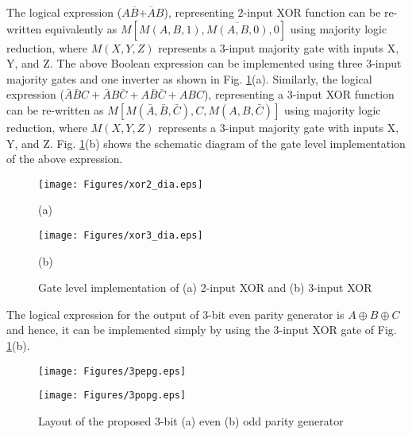 \documentclass[conference]{IEEEtran}
\begin{document}
 
The logical expression ($A\overline{B}$+$\overline{A}B$), representing $2$-input XOR function can be re-written equivalently as $M[M(A, B, 1), \overline{M(A, B, 0)}, 0]$ using majority logic reduction, where $M(X,Y,Z)$ represents a $3$-input majority gate \cite{lent_jap1994} with inputs X, Y, and Z.
The above Boolean expression can be implemented using three $3$-input majority gates and one inverter as shown in Fig. \ref{fig:XORs}(a).
Similarly, the logical expression ($\bar{A}\bar{B}C+\bar{A}B\bar{C}+A\bar{B}\bar{C}+ABC$), representing a $3$-input XOR function can be re-written as $M[{M(\bar{A},\bar{B},\bar{C})}, C, M(A, B,\bar{C})]$ using majority logic reduction, where $M(X,Y,Z)$ represents a $3$-input majority gate with inputs X, Y, and Z.
Fig. \ref{fig:XORs}(b) shows the schematic diagram of the gate level implementation of the above expression.
\begin{figure}[ht!]
\center
\texttt{[image: Figures/xor2\_dia.eps]}
\vspace{1 cm}
\centerline{(a)}
\texttt{[image: Figures/xor3\_dia.eps]}
\centerline{(b)}
\caption{\small Gate level implementation of (a) 2-input XOR and (b) 3-input XOR}
\label{fig:XORs}
\end{figure}
The logical expression for the output of $3$-bit even parity generator is $A \oplus B\oplus C$ and hence, it can be implemented simply by using the $3$-input XOR gate of Fig. \ref{fig:XORs}(b).
\begin{figure}[ht]
\hspace{-0.8cm}
\begin{minipage}[b]{0.45\linewidth}
\centering
\vspace{-1cm}
\texttt{[image: Figures/3pepg.eps]}
\vspace{-3cm}
\end{minipage}
\begin{minipage}[b]{0.45\linewidth}
\centering
\vspace{-1cm}
\texttt{[image: Figures/3popg.eps]}
\vspace{-3cm}
\end{minipage}
\vspace{-1cm}
\caption{\small Layout of the proposed $3$-bit (a) even (b) odd parity generator}
\label{fig:EvenOddPG}
\end{figure}
\end{document}
